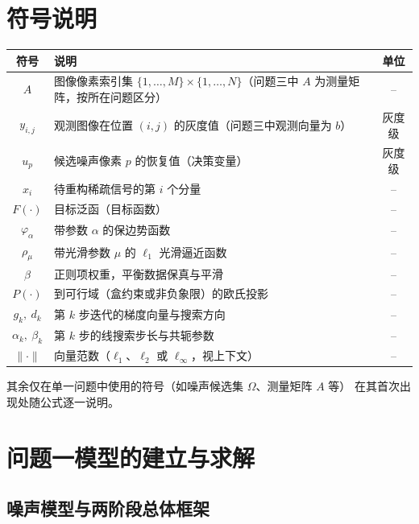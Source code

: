 \documentclass[withoutpreface,bwprint]{cumcmthesis}
\begin{document}
\section{符号说明}

\begin{center}
\begin{tabular}{clc}
  \toprule[1.5pt]
  符号 & 说明 & 单位 \\
  \midrule[1pt]
  $A$ & 图像像素索引集 $\{1,\ldots,M\}\times\{1,\ldots,N\}$（问题三中 $A$ 为测量矩阵，按所在问题区分） & -- \\
  $y_{i,j}$ & 观测图像在位置 $(i,j)$ 的灰度值（问题三中观测向量为 $b$） & 灰度级 \\
  $u_{p}$ & 候选噪声像素 $p$ 的恢复值（决策变量） & 灰度级 \\
  $x_{i}$ & 待重构稀疏信号的第 $i$ 个分量 & -- \\
  $F(\cdot)$ & 目标泛函（目标函数） & -- \\
  $\varphi_{\alpha}$ & 带参数 $\alpha$ 的保边势函数 & -- \\
  $\rho_{\mu}$ & 带光滑参数 $\mu$ 的 $\ell_1$ 光滑逼近函数 & -- \\
  $\beta$ & 正则项权重，平衡数据保真与平滑 & -- \\
  $P(\cdot)$ & 到可行域（盒约束或非负象限）的欧氏投影 & -- \\
  $g_k,\ d_k$ & 第 $k$ 步迭代的梯度向量与搜索方向 & -- \\
  $\alpha_k,\ \beta_k$ & 第 $k$ 步的线搜索步长与共轭参数 & -- \\
  $\|\cdot\|$ & 向量范数（$\ell_1$、$\ell_2$ 或 $\ell_\infty$，视上下文） & -- \\
  \bottomrule[1.5pt]
\end{tabular}
\end{center}

其余仅在单一问题中使用的符号（如噪声候选集 $\Omega$、测量矩阵 $A$ 等）
在其首次出现处随公式逐一说明。

\section{问题一模型的建立与求解}

\subsection{噪声模型与两阶段总体框架}
\end{document}
